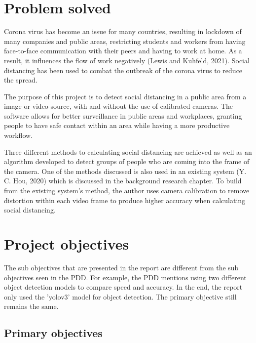 \documentclass[12pt]{report}
\begin{document}
\section{Problem solved}

Corona virus has become an issue for many countries, resulting in lockdown of many companies and public areas, restricting students and workers from having face-to-face communication with their peers and having to work at home. As a result, it influences the flow of work negatively (Lewis and Kuhfeld, 2021). Social distancing has been used to combat the outbreak of the corona virus to reduce the spread. 

\vspace{2mm}

The purpose of this project is to detect social distancing in a public area from a image or video source, with and without the use of calibrated cameras. The software allows for better surveillance in public areas and workplaces, granting people to have safe contact within an area while having a more productive workflow.

\vspace{2mm}

Three different methods to calculating social distancing are achieved as well as an algorithm developed to detect groups of people who are coming into the frame of the camera. One of the methods discussed is also used in an existing system (Y. C. Hou, 2020) which is discussed in the background research chapter. To build from the existing system's method, the author uses camera calibration to remove distortion within each video frame to produce higher accuracy when calculating social distancing.

\section{Project objectives}

The sub objectives that are presented in the report are different from the sub objectives seen in the PDD. For example, the PDD mentions using two different object detection models to compare speed and accuracy. In the end, the report only used the 'yolov3' model for object detection. The primary objective still remains the same.

\subsection{Primary objectives}
\end{document}
